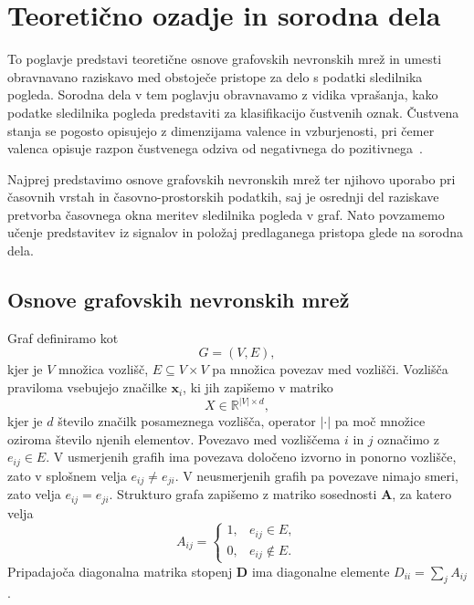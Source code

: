 \chapter{Teoretično ozadje in sorodna dela}
\label{sec:sorodna-dela}

To poglavje predstavi teoretične osnove grafovskih nevronskih mrež in umesti obravnavano raziskavo med obstoječe pristope za delo s podatki sledilnika pogleda.
Sorodna dela v tem poglavju obravnavamo z vidika vprašanja, kako podatke sledilnika pogleda predstaviti za klasifikacijo čustvenih oznak.
Čustvena stanja se pogosto opisujejo z dimenzijama valence in vzburjenosti, pri čemer valenca opisuje razpon čustvenega odziva od negativnega do pozitivnega~\cite{lim2020emotion}.

Najprej predstavimo osnove grafovskih nevronskih mrež ter njihovo uporabo pri časovnih vrstah in časovno-prostorskih podatkih, saj je osrednji del raziskave pretvorba časovnega okna meritev sledilnika pogleda v graf.
Nato povzamemo učenje predstavitev iz signalov in položaj predlaganega pristopa glede na sorodna dela.

\section{Osnove grafovskih nevronskih mrež}
\label{subsec:osnove-gnn}

Graf definiramo kot
\begin{equation}
    G = (V, E),
\end{equation}
kjer je $V$ množica vozlišč, $E \subseteq V \times V$ pa množica povezav med vozlišči.
Vozlišča praviloma vsebujejo značilke $\mathbf{x}_i$, ki jih zapišemo v matriko
\begin{equation}
    X \in \mathbb{R}^{|V| \times d},
\end{equation}
kjer je $d$ število značilk posameznega vozlišča, operator $|\cdot|$ pa moč množice oziroma število njenih elementov.
Povezavo med vozliščema $i$ in $j$ označimo z $e_{ij} \in E$.
V usmerjenih grafih ima povezava določeno izvorno in ponorno vozlišče, zato v splošnem velja $e_{ij} \ne e_{ji}$.
V neusmerjenih grafih pa povezave nimajo smeri, zato velja $e_{ij} = e_{ji}$.
Strukturo grafa zapišemo z matriko sosednosti $\mathbf{A}$, za katero velja
\begin{equation}
    A_{ij} =
    \begin{cases}
        1, & e_{ij} \in E, \\
        0, & e_{ij} \notin E.
    \end{cases}
\end{equation}
Pripadajoča diagonalna matrika stopenj $\mathbf{D}$ ima diagonalne elemente $D_{ii} = \sum_j A_{ij}$.

